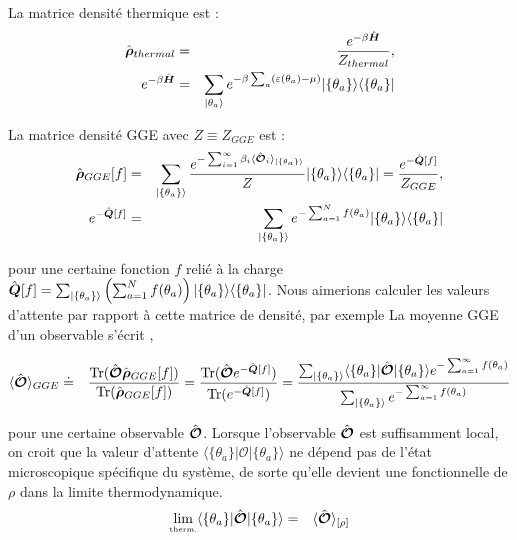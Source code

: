 	
	
	
	La matrice densité thermique est :
	\begin{eqnarray}
		\hat{\bm{\rho}}_{thermal} & = & \frac{e^{- \beta \hat{\bm{H}}}}{Z_{thermal}}, \\
		e^{-\beta \hat{\bm{H}}} & = & 	\sum_{\vert \theta_a \rangle} e^{- \beta \sum_a ( \varepsilon(\theta_a)- \mu ) } \vert \{ \theta_a\} \rangle \langle  \{ \theta_a\}  \vert 
	\end{eqnarray}
	
		
	



	

	
	La matrice densité GGE avec $Z \equiv Z_{GGE}$ est :
	\begin{eqnarray}
		\hat{\bm{\rho}}_{GGE}[f] & = & \sum_{\vert \{\theta_a \} \rangle }\frac{e^{-\sum_{i = 1}^\infty  \beta_i \langle \hat{\bm{\mathcal{O}}}_i \rangle_{\vert \{\theta_a \} \rangle} }}{Z} \vert \{\theta_a \}  \rangle   	\langle \{\theta_a \} \vert = \frac{e^{-\hat{\bm{Q}}[f]}}{Z_{GGE}}, \\
		e^{-\hat{\bm{Q}}[f]} & = & 	\sum_{\vert \{\theta_a \} \rangle } e^{- \sum_{a=1}^N  f(\theta_a) } \vert \{ \theta_a\} \rangle \langle  \{ \theta_a\}  \vert 
	\end{eqnarray}
	
	pour une certaine fonction $f$ relié à la charge $\hat{\bm{Q}} [f]  = \sum_{\vert \{\theta_a \} \rangle } \left ( \sum_{a = 1}^N f ( \theta_a )  \right ) \vert \{ \theta_a \} \rangle \langle \{ \theta_a \} \vert $. Nous aimerions calculer les valeurs d'attente par rapport à cette matrice de densité, par exemple
	La moyenne GGE d'un observable s'écrit ,
	
	\begin{eqnarray}
		\langle \hat{\bm{\mathcal{O}}} \rangle_{GGE} & \doteq & \displaystyle  \frac{\text{Tr} (\hat{\bm{\mathcal{O}}}\hat{\bm{\rho}}_{GGE}[f])}{\text{Tr} (\hat{\bm{\rho}}_{GGE}[f])} = \frac{\text{Tr} (\hat{\bm{\mathcal{O}}}e^{-\hat{\bm{Q}}[f]})}{\text{Tr} (e^{-\hat{\bm{Q}}[f]})}	 = \frac{ \sum_{\vert \{\theta_a \}\rangle} \langle  \{ \theta_a\}  \vert   \hat{\bm{\mathcal{O}}} \vert \{ \theta_a\} \rangle e^{- \sum_{a = 1 }^\infty f(\theta_a) }  }{\sum_{\vert  \{\theta_a  \} \rangle} e^{- \sum_{a=1}^\infty  f(\theta_a) } }
	\end{eqnarray}
	
	pour une certaine observable $\hat{\bm{\mathcal{O}}}$. Lorsque l'observable $\hat{\bm{\mathcal{O}}}$ est suffisamment local, on croit que la valeur d'attente $\langle  \{ \theta_a\}  \vert   \mathcal{O} \vert \{ \theta_a\} \rangle$ ne dépend pas de l'état microscopique spécifique du système, de sorte qu'elle devient une fonctionnelle de $\rho$ dans la limite thermodynamique.
	\begin{eqnarray}
		\underset{\mbox{\tiny therm.}}{\lim} \langle  \{ \theta_a\}  \vert   \hat{\bm{\mathcal{O}}} \vert \{ \theta_a\} \rangle & = & \langle \hat{\bm{\mathcal{O}}}\rangle_{[\rho]}
	\end{eqnarray}
	
